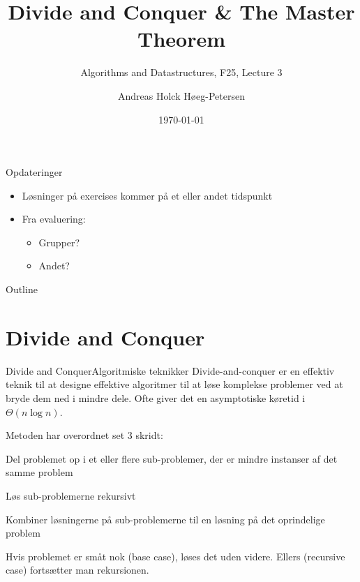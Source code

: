 \documentclass[aspectratio=1610]{beamer}
\title[ALG25 - Lecture 3]
{Divide and Conquer \& The Master Theorem}
\subtitle
{Algorithms and Datastructures, F25, Lecture 3}
\author[Andreas H. Høeg-Petersen]
{Andreas Holck Høeg-Petersen}
\institute[AAU]{%
  Department of Computer Science\\
  Aalborg University
}
\date {\today}
\begin{document}
\begin{frame}
  \titlepage
\end{frame}

\begin{frame}{Opdateringer}{}
    \begin{itemize}
        \item Løsninger på exercises kommer på et eller andet tidspunkt
        \item Fra evaluering:
            \begin{itemize}
                \item Grupper?
                \item Andet?
            \end{itemize}
    \end{itemize}
\end{frame}


\begin{frame}{Outline}
  \tableofcontents
\end{frame}


\section{Divide and Conquer}

\begin{frame}{Divide and Conquer}{Algoritmiske teknikker}
    Divide-and-conquer er en effektiv teknik til at designe effektive
    algoritmer til at løse komplekse problemer ved at bryde dem ned i mindre
    dele. Ofte giver det en asymptotiske køretid i $\Theta(n \log n)$.

    \pause \medskip
    Metoden har overordnet set 3 skridt:

    \pause
    \begin{description}[<+->][Combine]
        \item[Divide] Del problemet op i et eller flere sub-problemer, der er
            mindre instanser af det samme problem
        \item[Conquer] Løs sub-problemerne rekursivt
        \item[Combine] Kombiner løsningerne på sub-problemerne til en løsning på
            det oprindelige problem
    \end{description}

    \pause
    Hvis problemet er småt nok (\alert{base case}), løses det uden videre.
    Ellers (\alert{recursive case}) fortsætter man rekursionen.
\end{frame}
\end{document}
